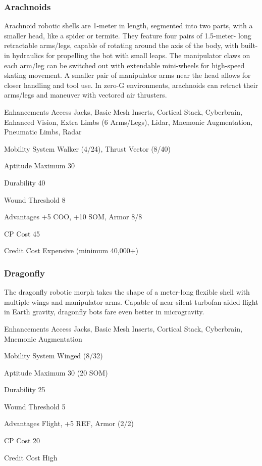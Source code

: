 \subsubsection{Arachnoids}
Arachnoid robotic shells are 1-meter in length, segmented into two parts, with
a smaller head, like a spider or termite. They feature four pairs of 1.5-meter-
long retractable arms/legs, capable of rotating around the axis of the body,
with built-in hydraulics for propelling the bot with small leaps. The
manipulator claws on each arm/leg can be switched out with extendable
mini-wheels for high-speed skating movement. A smaller pair of manipulator arms
near the head allows for closer handling and tool use. In zero-G environments,
arachnoids can retract their arms/legs and maneuver with vectored air
thrusters.

\begin{description*}
\item[Enhancements] Access Jacks, Basic Mesh Inserts, Cortical Stack,
  Cyberbrain, Enhanced Vision, Extra Limbs (6 Arms/Legs), Lidar, Mnemonic
  Augmentation, Pneumatic Limbs, Radar
\item[Mobility System] Walker (4/24), Thrust Vector (8/40) 
\item[Aptitude Maximum] 30 
\item[Durability] 40 
\item[Wound Threshold] 8 
\item[Advantages] +5 COO, +10 SOM, Armor 8/8 
\item[CP Cost] 45 
\item[Credit Cost] Expensive (minimum 40,000+) 
\end{description*}

\subsubsection{Dragonfly}
The dragonfly robotic morph takes the shape of a meter-long flexible shell with
multiple wings and manipulator arms. Capable of near-silent turbofan-aided
flight in Earth gravity, dragonfly bots fare even better in microgravity.

\begin{description*}
\item[Enhancements] Access Jacks, Basic Mesh Inserts, Cortical Stack,
  Cyberbrain, Mnemonic Augmentation
\item[Mobility System]  Winged (8/32) 
\item[Aptitude Maximum]  30 (20 SOM) 
\item[Durability]  25 
\item[Wound Threshold]  5 
\item[Advantages]  Flight, +5 REF, Armor (2/2)
\item[CP Cost]  20 
\item[Credit Cost] High
\end{description*}

